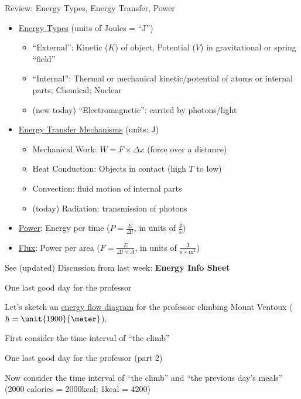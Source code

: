 \documentclass[12pt]{beamer}
\begin{document}
\begin{frame}{Review: Energy Types, Energy Transfer, Power}

\begin{itemize}
\item[] \underline{Energy Types} (units of Joules = ``J'')
	\begin{itemize}
	\item ``External'': Kinetic ($K$) of object, Potential ($V$) in gravitational or spring ``field''
	\item ``Internal'': Thermal or mechanical kinetic/potential of atoms or internal parts; Chemical; Nuclear
	\item (new today) ``Electromagnetic'': carried by photons/light
	\end{itemize}
\item[] \underline{Energy Transfer Mechanisms} (units: J)
	\begin{itemize}
	\item Mechanical Work: $W = F \times \Delta x$ (force  over a distance)
	\item Heat Conduction: Objects in contact (high $T$ to low)
	\item Convection: fluid motion of internal parts
	\item (today) Radiation: transmission of photons
	\end{itemize}
\item[] \underline{Power}: Energy per time ($P = \frac{E}{\Delta t}$, in units of $\frac{\text{J}}{\text{s}}$)
\item[] \underline{Flux}: Power per area ($F = \frac{E}{\Delta t \times A}$, in units of $\frac{\text{J}}{\text{s} \times \text{m}^2}$)
\end{itemize}

{\tiny See (updated) Discussion from last week: {\bf Energy Info Sheet}}
\end{frame}
\begin{frame}{One last good day for the professor}

Let's sketch an \underline{energy flow diagram} for the professor climbing Mount Ventoux ($h = \unit{1900}{\meter}$).

\vspace{6cm}

First consider the time interval of ``the climb''

\end{frame}
\begin{frame}{One last good day for the professor (part 2)}


\vspace{7cm}

Now consider the time interval of ``the climb'' and ``the previous day's meals'' (2000 calories = \unit{2000}{kcal}; \unit{1}{kcal} = \unit{4200}{\joule})

\end{frame}
\end{document}
